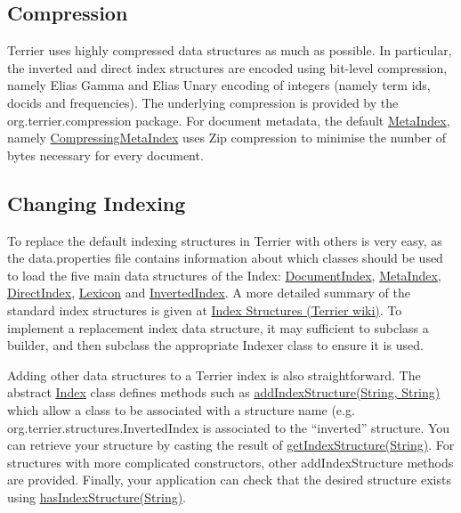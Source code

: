 \subsection{Compression}\label{compression}

Terrier uses highly compressed data structures as much as possible. In
particular, the inverted and direct index structures are encoded using
bit-level compression, namely Elias Gamma and Elias Unary encoding of
integers (namely term ids, docids and frequencies). The underlying
compression is provided by the org.terrier.compression package. For
document metadata, the default
\href{javadoc/org/terrier/structures/MetaIndex.html}{MetaIndex}, namely
\href{javadoc/org/terrier/structures/CompressingMetaIndex.html}{CompressingMetaIndex}
uses Zip compression to minimise the number of bytes necessary for every
document.

\subsection{Changing Indexing}\label{changing-indexing}

To replace the default indexing structures in Terrier with others is
very easy, as the data.properties file contains information about which
classes should be used to load the five main data structures of the
Index:
\href{javadoc/org/terrier/structures/DocumentIndex.html}{DocumentIndex},
\href{javadoc/org/terrier/structures/MetaIndex.html}{MetaIndex},
\href{javadoc/org/terrier/structures/bit/DirectIndex.html}{DirectIndex},
\href{javadoc/org/terrier/structures/Lexicon.html}{Lexicon} and
\href{javadoc/org/terrier/structures/bit/InvertedIndex.html}{InvertedIndex}.
A more detailed summary of the standard index structures is given at
\href{http://ir.dcs.gla.ac.uk/wiki/Terrier/IndexStructures}{Index
Structures (Terrier wiki)}. To implement a replacement index data
structure, it may sufficient to subclass a builder, and then subclass
the appropriate Indexer class to ensure it is used.

Adding other data structures to a Terrier index is also straightforward.
The abstract \href{javadoc/org/terrier/structures/Index.html}{Index}
class defines methods such as
\href{javadoc/org/terrier/structures/Index.html\#addIndexStructure(java.lang.String,\%20java.lang.String)}{addIndexStructure(String,
String)} which allow a class to be associated with a structure name
(e.g. org.terrier.structures.InvertedIndex is associated to the
``inverted'' structure. You can retrieve your structure by casting the
result of
\href{javadoc/org/terrier/structures/Index.html\#getIndexStructure(java.lang.String)}{getIndexStructure(String)}.
For structures with more complicated constructors, other
addIndexStructure methods are provided. Finally, your application can
check that the desired structure exists using
\href{javadoc/org/terrier/structures/Index.html\#hasIndexStructure(java.lang.String)}{hasIndexStructure(String)}.

